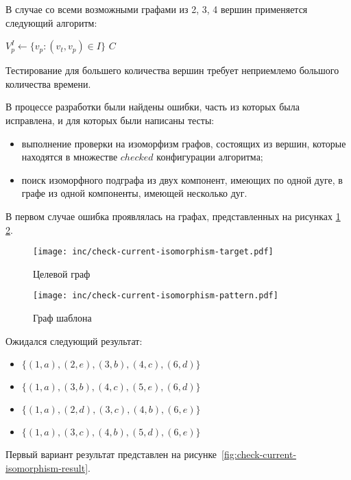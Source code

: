В случае со всеми возможными графами из 2, 3, 4 вершин применяется следующий алгоритм:

\begin{algorithmic}
                \State {}
                \State $V^I_p \gets \{ v_p : (v_t, v_p) \in I \}$
                \State {}
            \EndFor
        \EndFor
    \EndFor
\EndFor
\State \Return $C$
\end{algorithmic}

Тестирование для большего количества вершин требует неприемлемо большого
количества времени.

В процессе разработки были найдены ошибки, часть из которых была исправлена,
и для которых были написаны тесты:
\begin{itemize}
\item выполнение проверки на изоморфизм графов, состоящих из вершин,
которые находятся в множестве $checked$ конфигурации алгоритма;
\item поиск изоморфного подграфа из двух компонент, имеющих по одной дуге,
в графе из одной компоненты, имеющей несколько дуг.
\end{itemize}

В первом случае ошибка проявлялась на графах, представленных на
рисунках \ref{fig:check-current-isomorphism-target}
\ref{fig:check-current-isomorphism-pattern}.

\begin{figure}[!ht]
\centering
\texttt{[image: inc/check-current-isomorphism-target.pdf]}
\caption{Целевой граф}
\label{fig:check-current-isomorphism-target}
\end{figure}

\begin{figure}[!ht]
\centering
\texttt{[image: inc/check-current-isomorphism-pattern.pdf]}
\caption{Граф шаблона}
\label{fig:check-current-isomorphism-pattern}
\end{figure}

Ожидался следующий результат:
\begin{itemize}
\item $\{ (1, a), (2, e), (3, b), (4, c), (6, d) \}$
\item $\{ (1, a), (3, b), (4, c), (5, e), (6, d) \}$
\item $\{ (1, a), (2, d), (3, c), (4, b), (6, e) \}$
\item $\{ (1, a), (3, c), (4, b), (5, d), (6, e) \}$
\end{itemize}
Первый вариант результат представлен на
рисунке~\ref{fig:check-current-isomorphism-result}.

